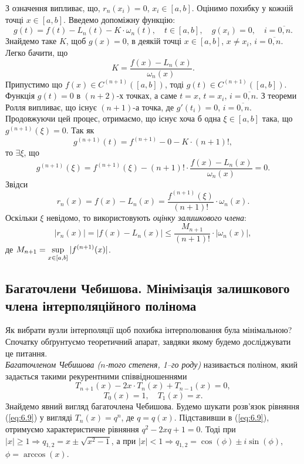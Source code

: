 З означення випливає, що, $r_n(x_i)=0$, $x_i\in[a,b]$. Оцінимо похибку у кожній точці $x\in[a,b]$. Введемо допоміжну функцію: \[g(t)=f(t)-L_n(t)-K\cdot\omega_n(t), \quad t\in[a,b], \quad g(x_i)=0, \quad i = \overline{0,n}.\] Знайдемо таке $K$, щоб $g(x)=0$, в деякій точці $x\in[a,b]$, $x\ne x_i$, $i=\overline{0,n}$. Легко бачити, що \[ K = \dfrac{f(x)-L_n(x)}{\omega_n(x)}. \] Припустимо що $f(x)\in C^{(n+1)}([a,b])$, тоді $g(t)\in C^{(n+1)}([a,b])$. Функція $g(t) = 0$ в $(n+2)$-х точках, а саме $t = x $, $t = x_i$, $i = \overline{0,n}$. З теореми Ролля випливає, що існує $(n+1)$-а точка, де $g'(t_i)=0$, $i = \overline{0,n}$. Продовжуючи цей процес, отримаємо, що існує хоча б одна $\xi \in [a,b]$ така, що $g^{(n+1)} (\xi) = 0$. Так як \[g^{(n+1)}(t) = f^{(n+1)}-0-K\cdot(n+1)!,\] то $\exists \xi$, що \[ g^{(n+1)}(\xi) = f^{(n+1)}(\xi)-(n+1)!\cdot\dfrac{f(x)-L_n(x)}{\omega_n(x)}=0.\] Звідси \begin{equation} \label{eq:6.7} r_n(x) = f(x) - L_n(x) = \dfrac{f^{(n+1)}(\xi)}{(n+1)!}\cdot\omega_n(x). \end{equation} Оскільки $\xi$ невідомо, то використовують \textit{оцінку залишкового члена}: \begin{equation} \label{eq:6.8} |r_n(x)| = |f(x) - L_n(x)| \le \dfrac{M_{n+1}}{(n+1)!}\cdot|\omega_n(x)|, \end{equation}
де $M_{n+1} = \displaystyle\sup\limits_{x\in[a,b]} |f^{(n+1)}(x)|$.
\subsection{Багаточлени Чебишова. Мінімізація залишкового члена інтерполяційного полінома}
Як вибрати вузли інтерполяції щоб похибка інтерполювання була мінімальною? Спочатку обґрунтуємо теоретичний апарат, завдяки якому будемо досліджувати це питання. \\

\textit{Багаточленом Чебишова ($n$-того степеня, 1–го роду)} називається поліном, який задається такими рекурентними співвідношеннями \begin{equation} \label{eq:6.9} T_{n+1}(x)-2x\cdot T_n(x)+T_{n-1}(x) = 0, \end{equation} \begin{equation} \label{eq:6.10} T_0(x) = 1, \quad T_1(x) = x. \end{equation} Знайдемо явний вигляд багаточлена Чебишова. Будемо шукати розв'язок рівняння (\ref{eq:6.9}) у вигляді $T_n(x) = q^n$, де $q = q(x)$. Підставивши в (\ref{eq:6.9}), отримуємо характеристичне рівняння $q^2 - 2xq + 1 = 0$. Тоді при $|x|\ge1\Rightarrow q_{1,2}=x\pm\sqrt{x^2-1}$, а при $|x|<1\Rightarrow q_{1,2}=\cos(\phi)\pm i\sin(\phi)$, $\phi = \arccos(x)$. \\

